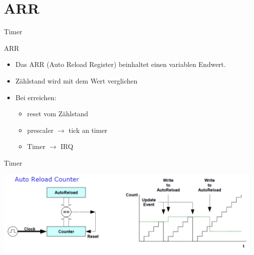   \section{ARR}
  \begin{frame}{Timer}
    \begin{block} {ARR}
      \begin{itemize}
        \item Das ARR (Auto Reload Register) beinhaltet einen variablen Endwert.
        \item Zählstand wird mit dem Wert verglichen
        \item Bei erreichen:
        \begin{itemize}
          \item reset vom Zählstand
          \item prescaler $\rightarrow$ tick an timer
          \item Timer $\rightarrow$ IRQ
        \end{itemize}
      \end{itemize}
    \end{block}
  \end{frame}

  \begin{frame}{Timer}
    \begin{center}
      \includegraphics[width=\textwidth]{figs/ARPE_disable}
    \end{center}
  \end{frame}

